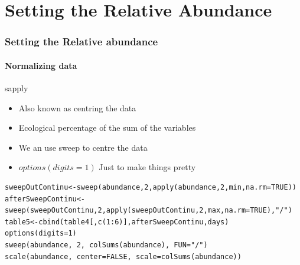 \documentclass[10pt,handout,english]{beamer}\usepackage[]{graphicx}\usepackage[]{color}
\begin{document}
\section*{Setting the Relative Abundance}
\begin{frame}[fragile]
  \frametitle{Setting the Relative abundance}
  \framesubtitle{Normalizing data}
  \begin{block}{sapply}
  \begin{itemize}
  \item Also known as centring the data
  \item Ecological percentage of the sum of the variables 
  \item We an use sweep to centre the data
  \item $options(digits=1)$ Just to make things pretty
  \end{itemize}
  \end{block}
  \begin{lstlisting}
sweepOutContinu<-sweep(abundance,2,apply(abundance,2,min,na.rm=TRUE))	
afterSweepContinu<-sweep(sweepOutContinu,2,apply(sweepOutContinu,2,max,na.rm=TRUE),"/") 
table5<-cbind(table4[,c(1:6)],afterSweepContinu,days)
options(digits=1)
sweep(abundance, 2, colSums(abundance), FUN="/")
scale(abundance, center=FALSE, scale=colSums(abundance))
 \end{lstlisting}

\end{frame}
\end{document}
